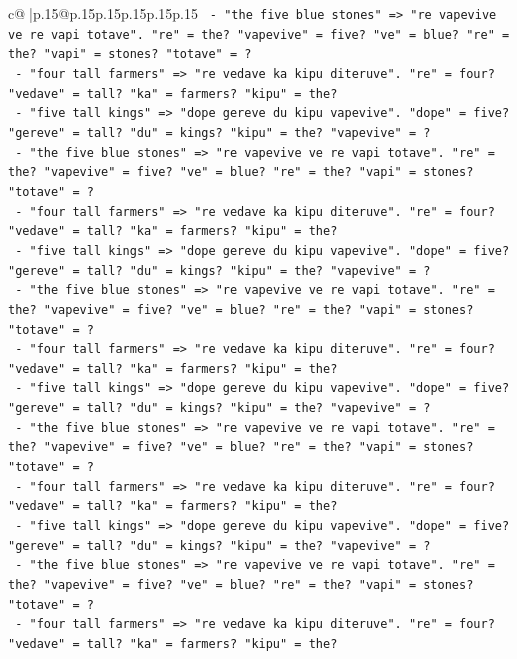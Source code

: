\documentclass{article}
\begin{document}
{\begin{supertabular}{c@{$\;$}|p{.15\linewidth}@{}p{.15\linewidth}p{.15\linewidth}p{.15\linewidth}p{.15\linewidth}p{.15\linewidth}}
{{{\texttt{    {-} "the five blue stones" => "re vapevive ve re vapi totave". "re" = the? "vapevive" = five? "ve" = blue? "re" = the? "vapi" = stones? "totave" = ?} \\
\texttt{    {-} "four tall farmers" => "re vedave ka kipu diteruve". "re" = four? "vedave" = tall? "ka" = farmers? "kipu" = the?} \\
\texttt{    {-} "five tall kings" => "dope gereve du kipu vapevive". "dope" = five? "gereve" = tall? "du" = kings? "kipu" = the? "vapevive" = ?} \\
\texttt{    {-} "the five blue stones" => "re vapevive ve re vapi totave". "re" = the? "vapevive" = five? "ve" = blue? "re" = the? "vapi" = stones? "totave" = ?} \\
\texttt{    {-} "four tall farmers" => "re vedave ka kipu diteruve". "re" = four? "vedave" = tall? "ka" = farmers? "kipu" = the?} \\
\texttt{    {-} "five tall kings" => "dope gereve du kipu vapevive". "dope" = five? "gereve" = tall? "du" = kings? "kipu" = the? "vapevive" = ?} \\
\texttt{    {-} "the five blue stones" => "re vapevive ve re vapi totave". "re" = the? "vapevive" = five? "ve" = blue? "re" = the? "vapi" = stones? "totave" = ?} \\
\texttt{    {-} "four tall farmers" => "re vedave ka kipu diteruve". "re" = four? "vedave" = tall? "ka" = farmers? "kipu" = the?} \\
\texttt{    {-} "five tall kings" => "dope gereve du kipu vapevive". "dope" = five? "gereve" = tall? "du" = kings? "kipu" = the? "vapevive" = ?} \\
\texttt{    {-} "the five blue stones" => "re vapevive ve re vapi totave". "re" = the? "vapevive" = five? "ve" = blue? "re" = the? "vapi" = stones? "totave" = ?} \\
\texttt{    {-} "four tall farmers" => "re vedave ka kipu diteruve". "re" = four? "vedave" = tall? "ka" = farmers? "kipu" = the?} \\
\texttt{    {-} "five tall kings" => "dope gereve du kipu vapevive". "dope" = five? "gereve" = tall? "du" = kings? "kipu" = the? "vapevive" = ?} \\
\texttt{    {-} "the five blue stones" => "re vapevive ve re vapi totave". "re" = the? "vapevive" = five? "ve" = blue? "re" = the? "vapi" = stones? "totave" = ?} \\
\texttt{    {-} "four tall farmers" => "re vedave ka kipu diteruve". "re" = four? "vedave" = tall? "ka" = farmers? "kipu" = the?} \\
}}}
\end{supertabular}}
\end{document}
